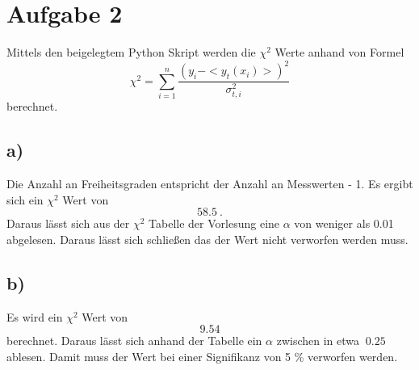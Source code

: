 \section*{Aufgabe 2}
Mittels den beigelegtem Python Skript werden die $\chi^2$ Werte anhand von Formel 
\begin{equation}
  \chi^2 = \sum_{i = 1}^n \frac{(y_i-<y_t(x_i)>)^2}{\sigma^2_{t,i}}
\end{equation}
berechnet.
\subsection*{a)}
Die Anzahl an Freiheitsgraden entspricht der Anzahl an Messwerten - 1. Es ergibt sich ein $\chi^2$ Wert von
\begin{equation}
  58.5 \ .
\end{equation}
Daraus lässt sich aus der $\chi^2$ Tabelle der Vorlesung eine $\alpha$ von weniger als 0.01 abgelesen. Daraus lässt sich schließen das der Wert nicht verworfen werden muss. 
\subsection*{b)}
Es wird ein $\chi^2$ Wert von
\begin{equation}
  9.54
\end{equation} 
berechnet. Daraus lässt sich anhand der Tabelle ein $\alpha$ zwischen in etwa $~0.25$ ablesen. Damit muss der Wert bei einer Signifikanz von 5 \% verworfen werden. 
